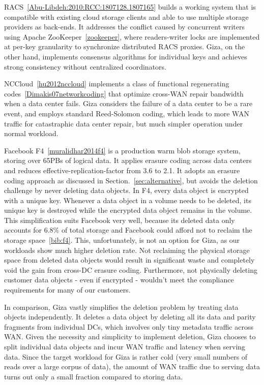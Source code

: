 RACS~\ref{Abu-Libdeh:2010:RCC:1807128.1807165} 
builds a working system that is compatible with existing cloud storage clients and able to use multiple storage providers as back-ends.
It addresses the conflict caused by concurrent writers using Apache ZooKeeper~\ref{zookeeper}, where readers-writer locks are implemented at per-key granularity to synchronize distributed RACS proxies.
Giza, on the other hand, implements consensus algorithms for individual keys and achieves strong consistency without centralized coordinators.

NCCloud~\ref{hu2012nccloud} implements a class of functional regenerating codes~\ref{Dimakis07networkcoding} that optimize cross-WAN repair bandwidth when a data center fails. Giza considers the failure of a data center to be a rare event, and employs standard Reed-Solomon coding, which leads to more WAN traffic for catastraphic data center repair, but much simpler operation under normal workload.

Facebook F4~\ref{muralidhar2014f4} is a production warm blob storage system, storing over 65PBs of logical data. It applies erasure coding across data centers and reduces effective-replication-factor from 3.6 to 2.1. 
It adopts an erasure coding approach as discussed in Section.~\ref{sec:alternative}, but avoids the deletion challenge by never deleting data objects. In F4, every data object is encrypted with a unique key. Whenever a data object in a volume needs to be deleted, its unique key is destroyed while the encrypted data object remains in the volume. This simplification suits Facebook very well, because its deleted data only accounts for $6.8\%$ of total storage and Facebook could afford not to reclaim the storage space~\ref{bib:f4}. This, unfortunately, is not an option for Giza, as our workloads show much higher deletion rate. Not reclaiming the physical storage space from deleted data objects would result in significant waste and completely void the gain from cross-DC erasure coding. Furthermore, not physically deleting customer data objects - even if encrypted - wouldn't meet the compliance requirements for many of our customers.

In comparison, Giza vastly simplifies the deletion problem by treating data objects independently. It deletes a data object by deleting all its data and parity fragments from individual DCs, which involves only tiny metadata traffic across WAN.
Given the necessity and simplicity to implement deletion, Giza chooses to split individual data objects and incur WAN traffic and latency when serving data. Since the target workload for Giza is rather cold (very small numbers of reads over a large corpus of data), the amount of WAN traffic due to serving data turns out only a small fraction compared to storing data.

